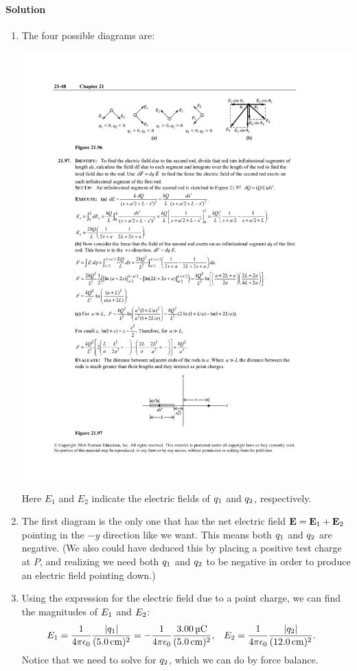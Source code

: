 \documentclass[11pt]{article}
\newenvironment{solution}
{
    \paragraph{Solution}
    \ignorespaces
}
{
    \bigskip
}
\begin{document}
\begin{solution}
	\begin{enumerate}
		\item The four possible diagrams are:
		
		\begin{center}
			\includegraphics[scale=1.5]{P21-96a}
		\end{center}
		
		Here $E_1$ and $E_2$ indicate the electric fields of $q_1$ and $q_2$, respectively.
		
		\item The first diagram is the only one that has the net electric field $\mathbf{E} = \mathbf{E}_1 + \mathbf{E}_2$ pointing in the $-y$ direction like we want.  This means {\color{blue} both $q_1$ and $q_2$ are negative}.  (We also could have deduced this by placing a positive test charge at $P$, and realizing we need both $q_1$ and $q_2$ to be negative in order to produce an electric field pointing down.)
		
		\item Using the expression for the electric field due to a point charge, we can find the magnitudes of $E_1$ and $E_2$:
		\begin{align*}
			\Eq &= \fk \frac{\abs{\qq}}{(\SI{5.0}{\cm})^2} = -\fk \frac{\SI{3.00}{\micro\coulomb}}{(\SI{5.0}{\cm})^2}, &
			\Ew &= \fk \frac{\abs{\qw}}{(\SI{12.0}{\cm})^2}.
		\end{align*}
		Notice that we need to solve for $q_2$, which we can do by force balance.
		

\end{enumerate}
\end{solution}
\end{document}
